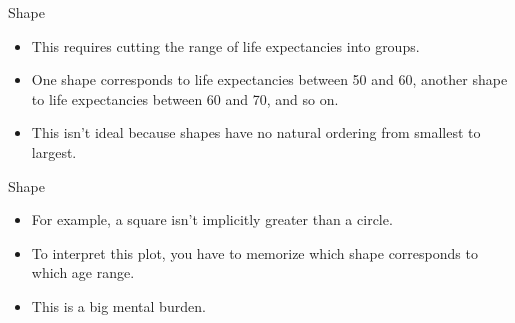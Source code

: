 \documentclass[
  ignorenonframetext,
]{beamer}
\begin{document}
\begin{frame}{Shape}
\label{shape-1}
\begin{itemize}
\item
  This requires cutting the range of life expectancies into groups.
\item
  One shape corresponds to life expectancies between 50 and 60, another
  shape to life expectancies between 60 and 70, and so on.
\item
  This isn't ideal because shapes have no natural ordering from smallest
  to largest.
\end{itemize}
\end{frame}

\begin{frame}{Shape}
\label{shape-2}
\begin{itemize}
\item
  For example, a square isn't implicitly greater than a circle.
\item
  To interpret this plot, you have to memorize which shape corresponds
  to which age range.
\item
  This is a big mental burden.
\end{itemize}
\end{frame}
\end{document}
